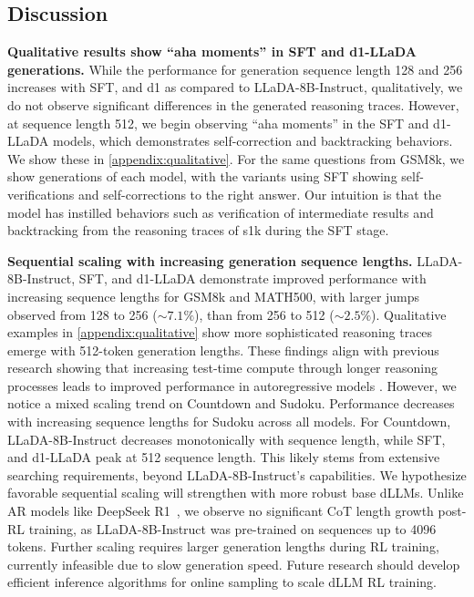 \subsection{Discussion}
\textbf{Qualitative results show ``aha moments'' in SFT and d1-LLaDA generations.} While the performance for generation sequence length 128 and 256 increases with SFT, \grpo and d1 as compared to LLaDA-8B-Instruct, qualitatively, we do not observe significant differences in the generated reasoning traces. However, at sequence length 512, we begin observing ``aha moments'' in the SFT and d1-LLaDA models, which demonstrates self-correction and backtracking behaviors. We show these in \cref{appendix:qualitative}. For the same questions from GSM8k, we show generations of each model, with the variants using SFT showing self-verifications and self-corrections to the right answer. 
Our intuition is that the model has instilled behaviors such as verification of intermediate results and backtracking from the reasoning traces of s1k during the SFT stage.

\textbf{Sequential scaling with increasing generation sequence lengths.} LLaDA-8B-Instruct, SFT, \grpo and d1-LLaDA demonstrate improved performance with increasing sequence lengths for GSM8k and MATH500, with larger jumps observed from 128 to 256 ($\sim7.1\%$), than from 256 to 512 ($\sim2.5\%$). Qualitative examples in \cref{appendix:qualitative} show more sophisticated reasoning traces emerge with 512-token generation lengths. These findings align with previous research showing that increasing test-time compute through longer reasoning processes leads to improved performance in autoregressive models \citep{muennighoff2025s1}. However, we notice a mixed scaling trend on Countdown and Sudoku. Performance decreases with increasing sequence lengths for Sudoku across all models. For Countdown, LLaDA-8B-Instruct decreases monotonically with sequence length, while SFT, \grpo{} and d1-LLaDA peak at 512 sequence length. This likely stems from extensive searching requirements, beyond LLaDA-8B-Instruct's capabilities. We hypothesize favorable sequential scaling will strengthen with more robust base dLLMs. Unlike AR models like DeepSeek R1~\citep{guo2025deepseek}, we observe no significant CoT length growth post-RL training, as LLaDA-8B-Instruct was pre-trained on sequences up to 4096 tokens. Further scaling requires larger generation lengths during RL training, currently infeasible due to slow generation speed. Future research should develop efficient inference algorithms for online sampling to scale dLLM RL training.


